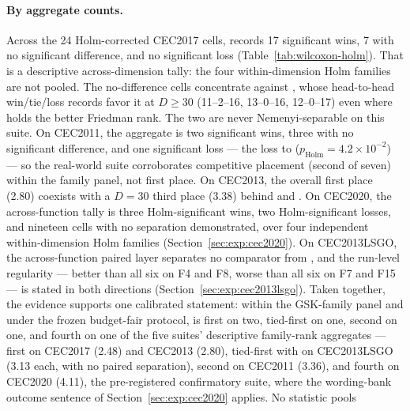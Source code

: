 \paragraph{By aggregate counts.}
Across the 24 Holm-corrected CEC2017 cells, \dtgsk{} records 17
significant wins, 7 with no significant difference, and no significant loss
(Table~\ref{tab:wilcoxon-holm}). That is a descriptive across-dimension tally:
the four within-dimension Holm families are not pooled. The
no-difference cells concentrate against
\egsk{}, whose head-to-head win/tie/loss records favor it at
$D \geq 30$ (11--2--16, 13--0--16, 12--0--17) even where \dtgsk{}
holds the better Friedman rank. The two are never
Nemenyi-separable on this suite.
On CEC2011, the aggregate is two significant wins, three with no
significant difference, and one significant loss --- the loss to \egsk{}
($p_{\mathrm{Holm}} = 4.2 \times 10^{-2}$) --- so the real-world
suite corroborates competitive placement (second of seven) within the
family panel, not first place.
On CEC2013, the overall first place (2.80) coexists with a $D = 30$
third place (3.38) behind \egsk{} and \atmals{}.
On CEC2020, the across-function tally is three Holm-significant wins,
two Holm-significant losses, and nineteen cells with no separation
demonstrated, over four independent within-dimension Holm families
(Section~\ref{sec:exp:cec2020}).
On CEC2013LSGO, the across-function paired layer separates no comparator
from \dtgsk{}, and the run-level regularity --- better than all six on
F4 and F8, worse than all six on F7 and F15 --- is stated in both
directions (Section~\ref{sec:exp:cec2013lsgo}).
Taken together, the evidence supports one calibrated statement:
within the GSK-family panel and under the frozen budget-fair
protocol, \dtgsk{} is first on two, tied-first on one, second on one,
and fourth on one of the five suites' descriptive family-rank
aggregates --- first on CEC2017 (2.48) and CEC2013 (2.80), tied-first
with \agsk{} on CEC2013LSGO (3.13 each, with no paired separation),
second on CEC2011 (3.36), and fourth on CEC2020 (4.11), the
pre-registered confirmatory suite, where the wording-bank outcome
sentence of Section~\ref{sec:exp:cec2020} applies. No statistic pools
